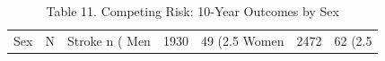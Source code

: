 \begin{table}[ht]
\centering
\caption{Table 11. Competing Risk: 10-Year Outcomes by Sex} 
\begin{tabular}{lrlll}
  \toprule
Sex & N & Stroke n (%
  \midrule
Men & 1930 & 49 (2.5%
  Women & 2472 & 62 (2.5%
   \bottomrule
\end{tabular}
\end{table}
